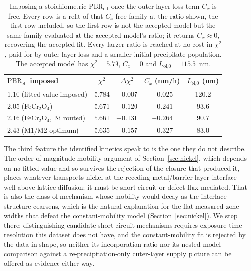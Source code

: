 \documentclass[a4paper,fleqn]{cas-sc}
\begin{document}
\begin{table}[htbp]
\centering
\caption{Imposing a stoichiometric $\mathrm{PBR}_\text{eff}$ once the
outer-layer loss term $C_x$ is free. Every row is a refit of that
$C_x$-free family at the ratio shown, the first row included, so the
first row is not the accepted model but the same family evaluated at the
accepted model's ratio; it returns $C_x \approx 0$, recovering the
accepted fit. Every larger ratio is reached at no cost in $\chi^2$, paid
for by outer-layer loss and a smaller initial precipitate population.
The accepted model has $\chi^2 = 5.79$, $C_x = 0$ and
$L_\text{ol,0} = 115.6$~nm.}
\label{tab:pbrclosure}
\small
\begin{tabular}{lcccc}
\toprule
$\mathrm{PBR}_\text{eff}$ imposed & $\chi^2$ & $\Delta\chi^2$ &
$C_x$ (nm/h) & $L_\text{ol,0}$ (nm) \\
\midrule
1.10 \; (fitted value imposed)    & 5.784 & $-0.007$ & $-0.025$ & 120.2 \\
2.05 \; (FeCr$_2$O$_4$)           & 5.671 & $-0.120$ & $-0.241$ & 93.6 \\
2.16 \; (FeCr$_2$O$_4$, Ni routed) & 5.661 & $-0.131$ & $-0.264$ & 90.7 \\
2.43 \; (M1/M2 optimum)           & 5.635 & $-0.157$ & $-0.327$ & 83.0 \\
\bottomrule
\end{tabular}
\end{table}

The third feature the identified kinetics speak to is the one they do
not describe. The order-of-magnitude mobility argument of
Section~\ref{sec:nickel}, which depends on no fitted value and so
survives the rejection of the closure that produced it, places whatever
transports nickel at the receding metal/barrier-layer interface well
above lattice diffusion: it must be short-circuit or defect-flux
mediated. That is also the class of mechanism whose mobility would decay as the
interface structure coarsens, which is the natural explanation for the
flat measured zone widths that defeat the constant-mobility model
(Section~\ref{sec:nickel}). We stop there: distinguishing candidate
short-circuit mechanisms requires exposure-time resolution this dataset
does not have, and the constant-mobility fit is rejected by the data in
shape, so neither its incorporation ratio nor its nested-model
comparison against a re-precipitation-only outer-layer supply picture
can be offered as evidence either way.
\end{document}
